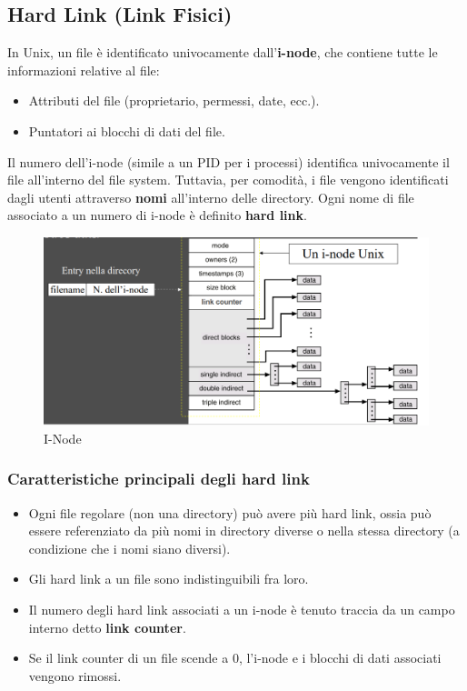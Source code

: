\subsection{Hard Link (Link Fisici)}
In Unix, un file è identificato univocamente dall'\textbf{i-node}, che contiene tutte le informazioni relative al file:
\begin{itemize}
    \item Attributi del file (proprietario, permessi, date, ecc.).
    \item Puntatori ai blocchi di dati del file.
\end{itemize}
Il numero dell'i-node (simile a un PID per i processi) identifica univocamente il file all'interno del file system. Tuttavia, per comodità, i file vengono identificati dagli utenti attraverso \textbf{nomi} all'interno delle directory. Ogni nome di file associato a un numero di i-node è definito \textbf{hard link}.

\begin{figure}[h] \centering \includegraphics[width=0.50\linewidth]{images/i_node_liinkfile.png} \caption{I-Node} \label{fig:14.4b} \end{figure}

\subsubsection{Caratteristiche principali degli hard link}
\begin{itemize}
    \item Ogni file regolare (non una directory) può avere più hard link, ossia può essere referenziato da più nomi in directory diverse o nella stessa directory (a condizione che i nomi siano diversi).
    \item Gli hard link a un file sono indistinguibili fra loro.
    \item Il numero degli hard link associati a un i-node è tenuto traccia da un campo interno detto \textbf{link counter}.
    \item Se il link counter di un file scende a 0, l'i-node e i blocchi di dati associati vengono rimossi.
\end{itemize}

